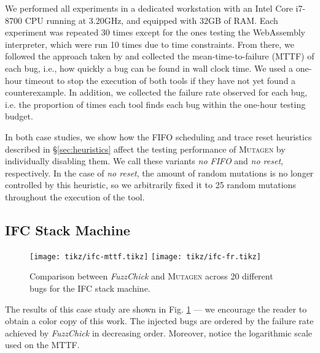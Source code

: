 \documentclass[sigconf, anonymous, review]{acmart}
\newcommand{\fuzzchick}{\textit{FuzzChick}\xspace}
\newcommand{\mutagen}{\textsc{Mutagen}\xspace}
\begin{document}
We performed all experiments in a dedicated workstation with an Intel Core
i7-8700 CPU running at 3.20GHz, and equipped with 32GB of RAM.
%
Each experiment was repeated 30 times except for the ones testing the
WebAssembly interpreter, which were run 10 times due to time constraints.
%
From there, we followed the approach taken by
\citeauthor{lampropoulos2019coverage} and collected the mean-time-to-failure
(MTTF) of each bug, i.e., how quickly a bug can be found in wall clock time.
%
We used a one-hour timeout to stop the execution of both tools if they have not
yet found a counterexample.
%
In addition, we collected the failure rate observed for each bug, i.e. the
proportion of times each tool finds each bug within the one-hour testing budget.
%

In both case studies, we show how the FIFO scheduling and trace reset heuristics
described in \S \ref{sec:heuristics} affect the testing performance of
\mutagen by individually disabling them.
%
We call these variants \textit{no FIFO} and \textit{no reset}, respectively.
%
In the case of \textit{no reset}, the amount of random mutations is no longer
controlled by this heuristic, so we arbitrarily fixed it to 25 random mutations
throughout the execution of the tool.

\subsection{IFC Stack Machine}

\begin{figure}[t]
  \centering
  \texttt{[image: tikz/ifc-mttf.tikz]}
  \texttt{[image: tikz/ifc-fr.tikz]}
  \caption{\label{fig:results:ifc} Comparison between \fuzzchick and \mutagen
    across 20 different bugs for the IFC stack machine. }
\end{figure}


The results of this case study are shown in Fig. \ref{fig:results:ifc} --- we
encourage the reader to obtain a color copy of this work.
%
The injected bugs are ordered by the failure rate achieved by \fuzzchick in
decreasing order.
%
Moreover, notice the logarithmic scale used on the MTTF.
\end{document}
